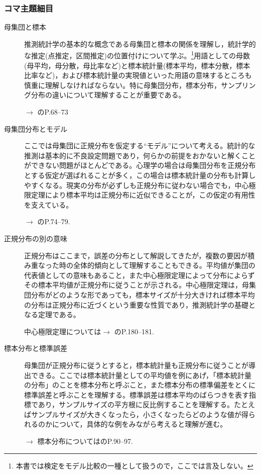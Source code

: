 \subsubsection{コマ主題細目}
\begin{description}
	\item[母集団と標本] 推測統計学の基本的な概念である母集団と標本の関係を理解し，統計学的な推定(点推定，区間推定)の位置付けについて学ぶ。\footnote{本書では検定をモデル比較の一種として扱うので，ここでは言及しない。}用語としての母数(母平均，母分散，母比率など)と標本統計量(標本平均，標本分散，標本比率など)，および標本統計量の実現値といった用語の意味するところも慎重に理解しなければならない。特に母集団分布，標本分布，サンプリング分布の違いについて理解することが重要である。
	      \begin{flushright}
		      $\to$ \textcite{Yamada2004}のP.68--73
	      \end{flushright}

	\item[母集団分布とモデル] ここでは母集団に正規分布を仮定する``モデル''について考える。統計的な推測は基本的に不良設定問題であり，何らかの前提をおかないと解くことができない問題がほとんどである。心理学の場合は母集団分布を正規分布とする仮定が選ばれることが多く，この場合は標本統計量の分布も計算しやすくなる。現実の分布が必ずしも正規分布に従わない場合でも，中心極限定理により標本平均は正規分布に近似できることが，この仮定の有用性を支えている。
	      \begin{flushright}
		      $\to$ \textcite{Yamada2004}のP.74--79.
	      \end{flushright}

	\item[正規分布の別の意味] 正規分布はここまで，誤差の分布として解説してきたが，複数の要因が積み重なった時の全体的傾向として理解することもできる。平均値が集団の代表値としての意味もあること，また中心極限定理によって分布によらずその標本平均値が正規分布に従うことが示される。中心極限定理は，母集団分布がどのような形であっても，標本サイズが十分大きければ標本平均の分布は正規分布に近づくという重要な性質であり，推測統計学の基礎となる定理である。
	      \begin{flushright}
		      中心極限定理については$\to$ \textcite{Minamoto2015}のP.180--181.
	      \end{flushright}

	\item[標本分布と標準誤差] 母集団が正規分布に従うとすると，標本統計量も正規分布に従うことが導出できる。ここでは標本統計量としての平均値を例にあげ，「標本統計量の分布」のことを標本分布と呼ぶこと，また標本分布の標準偏差をとくに標準誤差と呼ぶことを理解する。標準誤差は標本平均のばらつきを表す指標であり，サンプルサイズの平方根に反比例することを理解する。たとえばサンプルサイズが大きくなったら，小さくなったらどのような値が得られるのかについて，具体的な例をみながら考えると理解が進む。
	      \begin{flushright}
		      $\to$ 標本分布については\textcite{Yamada2004}のP.90--97.
	      \end{flushright}

\end{description}
